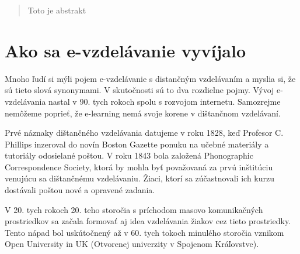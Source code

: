 \documentclass[12pt,twoside,slovak,a4paper]{article}
\begin{document}
    \begin{abstract}
        Toto je abstrakt
    \end{abstract}
    \section{Ako sa e-vzdelávanie vyvíjalo}
    Mnoho ľudí si mýli pojem e-vzdelávanie s distančným vzdelávaním a myslia si, že sú tieto slová synonymami.
    V skutočnosti sú to dva rozdielne pojmy. Vývoj e-vzdelávania nastal v 90. tych rokoch spolu s rozvojom internetu.
    Samozrejme nemôžeme poprieť, že e-learning nemá svoje korene v dištančnom vzdelávaní.

    Prvé náznaky dištančného vzdelávania datujeme v roku 1828, keď Profesor C. Phillips inzeroval do novín
    Boston Gazette ponuku na učebné materiály a tutoriály odosielané poštou. V roku 1843 bola 
    založená Phonographic Correspondence Society, ktorá by mohla byť považovaná za prvú inštitúciu 
    venujúcu sa dištančnému vzdelávaniu. Žiaci, ktorí sa zúčastnovali ich kurzu dostávali poštou
    nové a opravené zadania.

    V 20. tych rokoch 20. teho storočia s príchodom masovo komunikačných prostriedkov sa začala formovať aj idea
    vzdelávania žiakov cez tieto prostriedky. Tento nápad bol uskútočnený až v 60. tych tokoch minulého storočia 
    vznikom Open University in UK (Otvorenej univerzity v Spojenom Kráľovstve).
\end{document}
